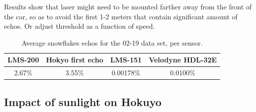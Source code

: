 Results show that laser might need to be mounted farther away from the front of the car, so as to avoid the first 1-2 meters that contain significant amount of echos. Or adjust threshold as a function of speed.

\begin{table}[htbp]
    \centering
    \begin{tabular}{|c|c|c|c|}
        \hline
        \textbf{LMS-200}       & \textbf{Hokyo first echo}  & \textbf{LMS-151}  & \textbf{Velodyne HDL-32E}  \\\hline
                 2.67\%            &           3.55\%                 &       0.00178\%     &  0.0100\%  \\\hline
    \end{tabular}
    \caption{Average snowflakes echos for the 02-19 data set, per sensor.}
    \label{tab:avgRates}
\end{table}

\subsection{Impact of sunlight on Hokuyo}


